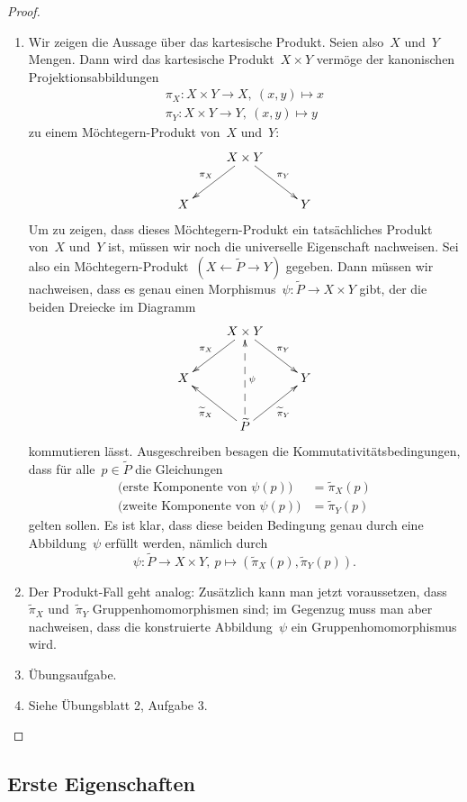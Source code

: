 \begin{proof}
\begin{enumerate}
\item Wir zeigen die Aussage über das kartesische Produkt. Seien also~$X$
und~$Y$ Mengen. Dann wird das kartesische Produkt~$X \times Y$ vermöge der
kanonischen Projektionsabbildungen
\begin{align*}
  \pi_X : X \times Y \to X,\ (x,y) \mapsto x \\
  \pi_Y : X \times Y \to Y,\ (x,y) \mapsto y
\end{align*}
zu einem Möchtegern-Produkt von~$X$ und~$Y$:
\[ \xymatrix{
  & X \times Y \ar[ld]_{\pi_X} \ar[rd]^{\pi_Y} \\
  X & & Y
} \]
Um zu zeigen, dass dieses Möchtegern-Produkt ein tatsächliches Produkt von~$X$
und~$Y$ ist, müssen wir noch die universelle Eigenschaft nachweisen. Sei also
ein Möchtegern-Produkt~$(X \leftarrow \widetilde P \to Y)$ gegeben. Dann müssen
wir nachweisen, dass es genau einen Morphismus~$\psi:\widetilde P \to X \times
Y$ gibt, der die beiden Dreiecke im Diagramm
\[ \xymatrix{
    & X \times Y \ar[ld]_{\pi_X} \ar[rd]^{\pi_Y} \\
  X & & Y \\
    & \widetilde P \ar[lu]^{\widetilde \pi_X} \ar@{-->}[uu]_\psi \ar[ru]_{\widetilde \pi_Y}
  } \]
kommutieren lässt. Ausgeschreiben besagen die Kommutativitätsbedingungen, dass
für alle~$p \in \widetilde P$ die Gleichungen
\begin{align*}
  \text{(erste Komponente von $\psi(p)$)} &= \widetilde \pi_X(p) \\
  \text{(zweite Komponente von $\psi(p)$)} &= \widetilde \pi_Y(p)
\end{align*}
gelten sollen.
Es ist klar, dass diese beiden Bedingung genau durch eine Abbildung~$\psi$
erfüllt werden, nämlich durch
\[ \psi : \widetilde P \to X \times Y,\ p \mapsto (\widetilde \pi_X(p),
\widetilde \pi_Y(p)). \]
\item Der Produkt-Fall geht analog: Zusätzlich kann man jetzt voraussetzen,
dass~$\widetilde \pi_X$ und~$\widetilde \pi_Y$ Gruppenhomomorphismen sind; im
Gegenzug muss man aber nachweisen, dass die konstruierte Abbildung~$\psi$ ein
Gruppenhomomorphismus wird.
\item Übungsaufgabe.
\item Siehe Übungsblatt 2, Aufgabe 3. \qedhere
\end{enumerate}
\end{proof}


\subsection{Erste Eigenschaften}

